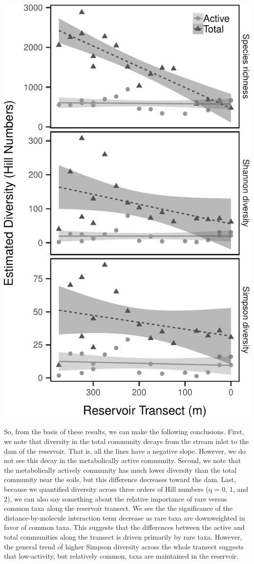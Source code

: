 \documentclass[]{article}
\begin{document}
\begin{center}\includegraphics[width=0.7\linewidth]{ReservoirGradient_files/figure-latex/hill_numbers-1} \end{center}

So, from the basis of these results, we can make the following
conclusions. First, we note that diversity in the total community decays
from the stream inlet to the dam of the reservoir. That is, all the
lines have a negative slope. However, we do not see this decay in the
metabolically active community. Second, we note that the metabolically
actively community has much lower diversity than the total community
near the soils, but this difference decreases toward the dam. Last,
because we quantified diversity across three orders of Hill numbers (q =
0, 1, and 2), we can also say something about the relative importance of
rare versus common taxa along the reservoir transect. We see the the
significance of the distance-by-molecule interaction term decrease as
rare taxa are downweighted in favor of common taxa. This suggests that
the differences between the active and total communities along the
transect is driven primarily by rare taxa. However, the general trend of
higher Simpson diversity across the whole transect suggests that
low-activity, but relatively common, taxa are maintained in the
reservoir.
\end{document}
